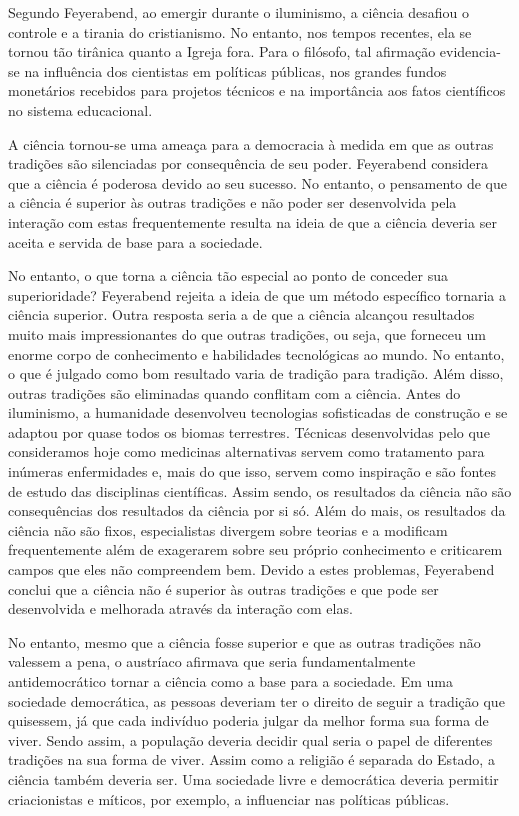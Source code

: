 \documentclass[12pt]{report}
\begin{document}
			Segundo Feyerabend, ao emergir durante o iluminismo, a ciência desafiou o controle e a tirania do cristianismo. No entanto, nos tempos recentes, ela se tornou tão tirânica quanto a Igreja fora. Para o filósofo, tal afirmação evidencia-se na influência dos cientistas em políticas públicas, nos grandes fundos monetários recebidos para projetos técnicos e na importância aos fatos científicos no sistema educacional.
		
			A ciência tornou-se uma ameaça para a democracia à medida em que as outras tradições são silenciadas por consequência de seu poder. Feyerabend considera que a ciência é poderosa devido ao seu sucesso. No entanto, o pensamento de que a ciência é superior às outras tradições e não poder ser desenvolvida pela interação com estas frequentemente resulta na ideia de que a ciência deveria ser aceita e servida de base para a sociedade.
		
			No entanto, o que torna a ciência tão especial ao ponto de conceder sua superioridade? Feyerabend rejeita a ideia de que um método específico tornaria a ciência superior. Outra resposta seria a de que a ciência alcançou resultados muito mais impressionantes do que outras tradições, ou seja, que forneceu um enorme corpo de conhecimento e habilidades tecnológicas ao mundo. No entanto, o que é julgado como bom resultado varia de tradição para tradição. Além disso, outras tradições são eliminadas quando conflitam com a ciência. Antes do iluminismo, a humanidade desenvolveu tecnologias sofisticadas de construção e se adaptou por quase todos os biomas terrestres. Técnicas desenvolvidas pelo que consideramos hoje como medicinas alternativas servem como tratamento para inúmeras enfermidades e, mais do que isso, servem como inspiração e são fontes de estudo das disciplinas científicas. Assim sendo, os resultados da ciência não são consequências dos resultados da ciência por si só. Além do mais, os resultados da ciência não são fixos, especialistas divergem sobre teorias e a modificam frequentemente além de exagerarem sobre seu próprio conhecimento e criticarem campos que eles não compreendem bem. Devido a estes problemas, Feyerabend conclui que a ciência não é superior às outras tradições e que pode ser desenvolvida e melhorada através da interação com elas.
			
			No entanto, mesmo que a ciência fosse superior e que as outras tradições não valessem a pena, o austríaco afirmava que seria fundamentalmente antidemocrático tornar a ciência como a base para a sociedade. Em uma sociedade democrática, as pessoas deveriam ter o direito de seguir a tradição que quisessem, já que cada indivíduo poderia julgar da melhor forma sua forma de viver. Sendo assim, a população deveria decidir qual seria o papel de diferentes tradições na sua forma de viver. Assim como a religião é separada do Estado, a ciência também deveria ser. Uma sociedade livre e democrática deveria permitir criacionistas e míticos, por exemplo, a influenciar nas políticas públicas.
		
\end{document}
